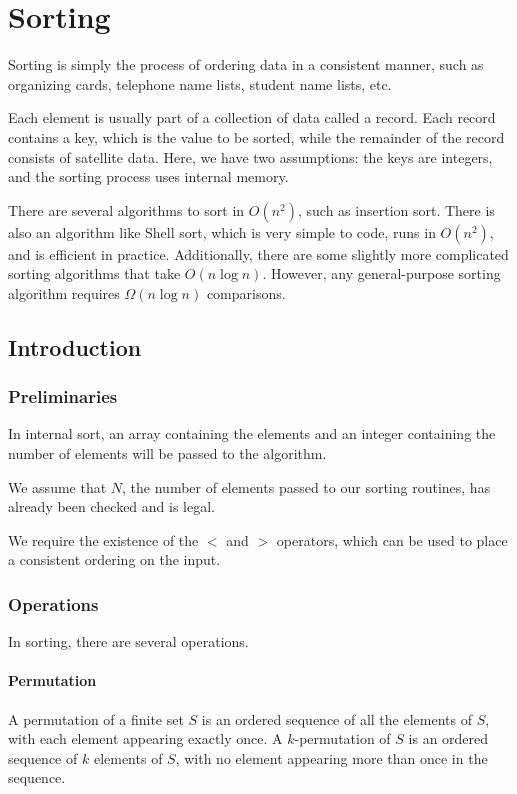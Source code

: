 \chapter{Sorting}

Sorting is simply the process of ordering data in a consistent manner, such as organizing cards, telephone name lists, student name lists, etc.

Each element is usually part of a collection of data called a record. Each record contains a key, which is the value to be sorted, while the remainder of the record consists of satellite data. Here, we have two assumptions: the keys are integers, and the sorting process uses internal memory.

There are several algorithms to sort in \(O(n^2)\), such as insertion sort. There is also an algorithm like Shell sort, which is very simple to code, runs in \(O(n^2)\), and is efficient in practice. Additionally, there are some slightly more complicated sorting algorithms that take \(O(n \log n)\). However, any general-purpose sorting algorithm requires \(\Omega(n \log n)\) comparisons.

\section{Introduction}
\subsection{Preliminaries}
In internal sort, an array containing the elements and an integer containing the number of elements will be passed to the algorithm.

We assume that \(N\), the number of elements passed to our sorting routines, has already been checked and is legal.

We require the existence of the \(<\) and \(>\) operators, which can be used to place a consistent ordering on the input.

\subsection{Operations}
In sorting, there are several operations.

\subsubsection{Permutation}
A permutation of a finite set \(S\) is an ordered sequence of all the elements of \(S\), with each element appearing exactly once. A \(k\)-permutation of \(S\) is an ordered sequence of \(k\) elements of \(S\), with no element appearing more than once in the sequence. 

